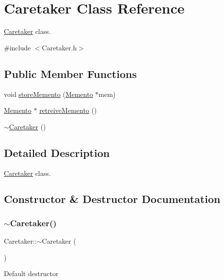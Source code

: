 \hypertarget{classCaretaker}{}\section{Caretaker Class Reference}
\label{classCaretaker}


\hyperlink{classCaretaker}{Caretaker} class.  




{\ttfamily \#include $<$Caretaker.\+h$>$}

\subsection*{Public Member Functions}
\begin{DoxyCompactItemize}
\item 
void \hyperlink{classCaretaker_af818c5b72a75066509b0f61989d67a93}{store\+Memento} (\hyperlink{classMemento}{Memento} $\ast$mem)
\item 
\hyperlink{classMemento}{Memento} $\ast$ \hyperlink{classCaretaker_a1d50fe3b0cbf191f1f260e0bb7f579e6}{retreive\+Memento} ()
\item 
\hyperlink{classCaretaker_a66b14e6d4b79fe9e45051217cee105e8}{$\sim$\+Caretaker} ()
\end{DoxyCompactItemize}


\subsection{Detailed Description}
\hyperlink{classCaretaker}{Caretaker} class. 

\subsection{Constructor \& Destructor Documentation}
\mbox{\label{classCaretaker_a66b14e6d4b79fe9e45051217cee105e8}} 
\subsubsection{\texorpdfstring{$\sim$\+Caretaker()}{~Caretaker()}}
{\footnotesize\ttfamily Caretaker\+::$\sim$\+Caretaker (\begin{DoxyParamCaption}{ }\end{DoxyParamCaption})}

Default destructor 

